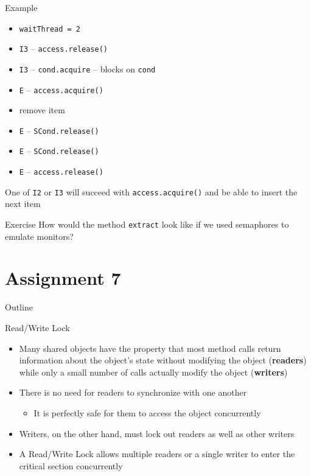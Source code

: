 \begin{frame}{Example}
  \begin{itemize}
  \item \lstinline!waitThread = 2!
  \item \lstinline!I3! -- \lstinline!access.release()!
  \item \lstinline!I3! -- \lstinline!cond.acquire! -- blocks on \lstinline!cond!
  \item \lstinline!E! -- \lstinline!access.acquire()!
  \item remove item
  \item \lstinline!E! -- \lstinline!SCond.release()!
  \item \lstinline!E! -- \lstinline!SCond.release()!
  \item \lstinline!E! -- \lstinline!access.release()!
  \end{itemize}


  One of \lstinline!I2! or \lstinline!I3! will succeed with
  \lstinline!access.acquire()! and be able to insert the next item
\end{frame}

\begin{frame}{Exercise}
  How would the method \lstinline!extract! look like if we used
  semaphores to emulate monitors?
\end{frame}


\section{Assignment 7}

\begin{frame}{Outline}
  \tableofcontents[current]
\end{frame}

\begin{frame}{Read/Write Lock}
  \begin{itemize}
  \item Many shared objects have the property that most method calls
    return information about the object's state without modifying the
    object ({\bf readers}) while only a small number of calls actually
    modify the object ({\bf writers})
  \item There is no need for readers to synchronize with one another
    \begin{itemize}
    \item It is perfectly safe for them to access the object
      concurrently
    \end{itemize}
  \item Writers, on the other hand, must lock out readers as well as
    other writers
  \item A Read/Write Lock allows multiple readers or a single
    writer to enter the critical section concurrently
  \end{itemize}
\end{frame}

